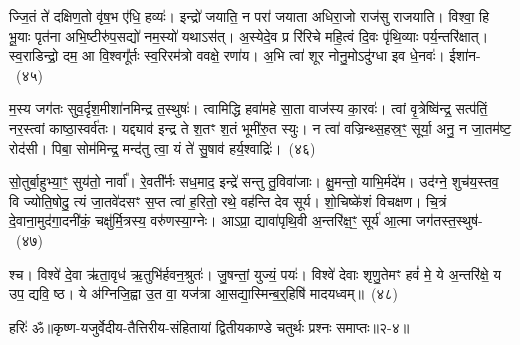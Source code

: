 ज्जि॒तं ते॑ दक्षिण॒तो वृ॑ष॒भ ए॑धि॒ हव्यः॑। इन्द्रो॑ जयाति॒ न परा॑ जयाता अधिरा॒जो राज॑सु राजयाति। विश्वा॒ हि भू॒याः पृत॑ना अभि॒ष्टीरु॑प॒सद्यो॑ नम॒स्यो॑ यथा\-ऽ\-स॑त्। अ॒स्येदे॒व प्र रि॑रिचे महि॒त्वं दि॒वः पृ॑थि॒व्याः पर्य॒न्तरि॑क्षात्। स्व॒राडिन्द्रो॒ दम॒ आ वि॒श्वगू᳚र्तः स्व॒रिरम॑त्रो ववक्षे॒ रणा॑य। अ॒भि त्वा॑ शूर नोनु॒मो\-ऽदु॑ग्धा इव धे॒नवः॑। ईशा॑न-~(४५)\ip

म॒स्य जग॑तः सुव॒र्दृश॒मीशा॑नमिन्द्र त॒स्थुषः॑। त्वामिद्धि हवा॑महे सा॒ता वाज॑स्य का॒रवः॑। त्वां वृ॒त्रेष्वि॑न्द्र॒ सत्प॑तिं॒ नर॒स्त्वां काष्ठा॒स्वर्व॑तः। यद्द्याव॑ इन्द्र ते श॒तꣳ श॒तं भूमी॑रु॒त स्युः। न त्वा॑ वज्रिन्थ्स॒हस्र॒ꣳ॒ सूर्या॒ अनु॒ न जा॒तम॑ष्ट॒ रोद॑सी। पिबा॒ सोम॑मिन्द्र॒ मन्द॑तु त्वा॒ यं ते॑ सु॒षाव॑ हर्य॒श्वाद्रिः॑।~(४६)\ip

सो॒तुर्बा॒हुभ्या॒ꣳ॒ सुय॑तो॒ नार्वा᳚। रे॒वती᳚र्नः सध॒माद॒ इन्द्रे॑ सन्तु तु॒विवा॑जाः। क्षु॒मन्तो॒ याभि॒र्मदे॑म। उद॑ग्ने॒ शुच॑य॒स्तव॒ वि ज्योति॒षोदु॒ त्यं जा॒तवे॑दसꣳ स॒प्त त्वा॑ ह॒रितो॒ रथे॒ वह॑न्ति देव सूर्य। शो॒चिष्के॑शं विचक्षण। चि॒त्रं दे॒वाना॒मुद॑गा॒दनी॑कं॒ चक्षु॑र्मि॒त्रस्य॒ वरु॑णस्या॒ग्नेः। आ\-ऽप्रा॒ द्यावा॑\-पृथि॒वी अ॒न्तरि॑क्ष॒ꣳ॒ सूर्य॑ आ॒त्मा जग॑तस्त॒स्थुष॑-~(४७)\ip

श्च। विश्वे॑ दे॒वा ऋ॑ता॒वृध॑ ऋ॒तुभि॑र्\mbox{}हवन॒श्रुतः॑। जु॒षन्तां॒ युज्यं॒ पयः॑। विश्वे॑ देवाः शृणु॒तेमꣳ हवं॑ मे॒ ये अ॒न्तरि॑क्षे॒ य उप॒ द्यवि॒ ष्ठ। ये अ॑ग्निजि॒ह्वा उ॒त वा॒ यज॑त्रा आ॒सद्या॒स्मिन्ब॒र्॒\mbox{}हिषि॑ मादयध्वम्॥~(४८)\ip

{\anuvakamend[{तदीशा॑न॒मद्रि॑स्त॒स्थुष॑स्त्रि॒ꣳ॒शच्च॑}]}%

{हरिः॑ ॐ}{॥कृष्ण-यजुर्वेदीय-तैत्तिरीय-संहितायां द्वितीयकाण्डे चतुर्थः प्रश्नः समाप्तः॥२-४॥}


